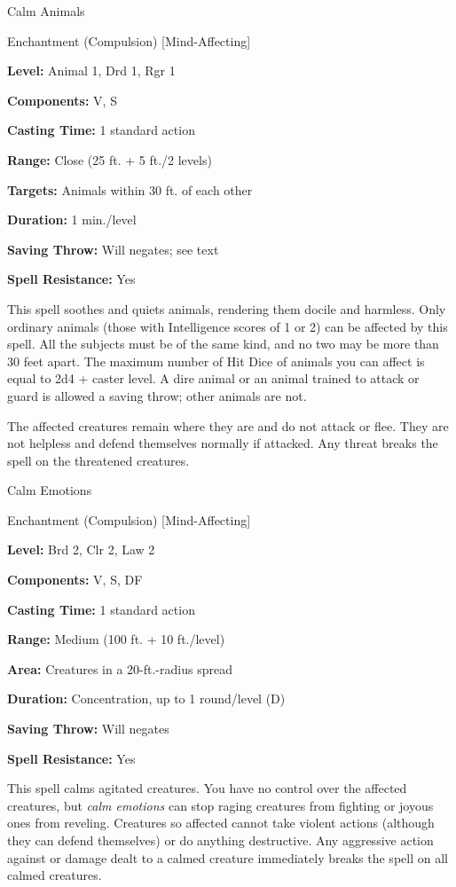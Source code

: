 \documentclass{article}
\begin{document}
\vspace{12pt}
Calm Animals

Enchantment (Compulsion) [Mind-Affecting]

\textbf{Level:} Animal 1, Drd 1, Rgr 1

\textbf{Components:} V, S

\textbf{Casting Time:} 1 standard action

\textbf{Range:} Close (25 ft. + 5 ft./2 levels)

\textbf{Targets:} Animals within 30 ft. of each other

\textbf{Duration:} 1 min./level

\textbf{Saving Throw: }Will negates; see text

\textbf{Spell Resistance:} Yes

This spell soothes and quiets animals, rendering them docile and harmless. Only 
ordinary animals (those with Intelligence scores of 1 or 2) can be affected by 
this spell. All the subjects must be of the same kind, and no two may be more than 
30 feet apart. The maximum number of Hit Dice of animals you can affect is equal 
to 2d4 + caster level. A dire animal or an animal trained to attack or guard is 
allowed a saving throw; other animals are not.

The affected creatures remain where they are and do not attack or flee. They are 
not helpless and defend themselves normally if attacked. Any threat breaks the 
spell on the threatened creatures.

\vspace{12pt}
Calm Emotions

Enchantment (Compulsion) [Mind-Affecting]

\textbf{Level:} Brd 2, Clr 2, Law 2

\textbf{Components:} V, S, DF

\textbf{Casting Time:} 1 standard action

\textbf{Range: }Medium (100 ft. + 10 ft./level)

\textbf{Area:} Creatures in a 20-ft.-radius spread

\textbf{Duration:} Concentration, up to 1 round/level (D)

\textbf{Saving Throw: }Will negates

\textbf{Spell Resistance:} Yes

This spell calms agitated creatures. You have no control over the affected creatures, 
but \textit{calm emotions }can stop raging creatures from fighting or joyous ones 
from reveling. Creatures so affected cannot take violent actions (although they 
can defend themselves) or do anything destructive. Any aggressive action against 
or damage dealt to a calmed creature immediately breaks the spell on all calmed 
creatures.
\end{document}
